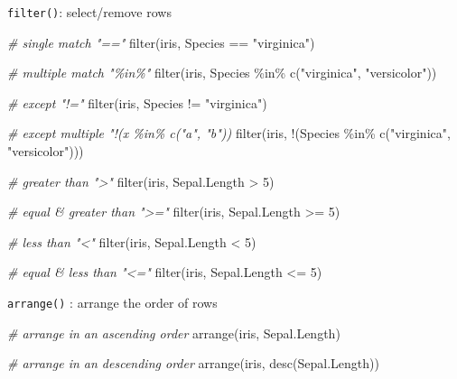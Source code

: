 \documentclass[
]{article}
\newenvironment{Shaded}{\begin{snugshade}}{\end{snugshade}}
\newcommand{\CommentTok}[1]{\textcolor[rgb]{0.56,0.35,0.01}{\textit{#1}}}
\newcommand{\DecValTok}[1]{\textcolor[rgb]{0.00,0.00,0.81}{#1}}
\newcommand{\FunctionTok}[1]{\textcolor[rgb]{0.00,0.00,0.00}{#1}}
\newcommand{\NormalTok}[1]{#1}
\newcommand{\SpecialCharTok}[1]{\textcolor[rgb]{0.00,0.00,0.00}{#1}}
\newcommand{\StringTok}[1]{\textcolor[rgb]{0.31,0.60,0.02}{#1}}
\begin{document}
\texttt{filter()}: select/remove rows

\begin{Shaded}
\begin{Highlighting}[]
\CommentTok{\# single match "=="}
\FunctionTok{filter}\NormalTok{(iris, Species }\SpecialCharTok{==} \StringTok{"virginica"}\NormalTok{)}

\CommentTok{\# multiple match "\%in\%"}
\FunctionTok{filter}\NormalTok{(iris, Species }\SpecialCharTok{\%in\%} \FunctionTok{c}\NormalTok{(}\StringTok{"virginica"}\NormalTok{, }\StringTok{"versicolor"}\NormalTok{))}

\CommentTok{\# except "!="}
\FunctionTok{filter}\NormalTok{(iris, Species }\SpecialCharTok{!=} \StringTok{"virginica"}\NormalTok{)}

\CommentTok{\# except multiple "!(x \%in\% c("a", "b"))}
\FunctionTok{filter}\NormalTok{(iris, }\SpecialCharTok{!}\NormalTok{(Species }\SpecialCharTok{\%in\%} \FunctionTok{c}\NormalTok{(}\StringTok{"virginica"}\NormalTok{, }\StringTok{"versicolor"}\NormalTok{)))}

\CommentTok{\# greater than "\textgreater{}"}
\FunctionTok{filter}\NormalTok{(iris, Sepal.Length }\SpecialCharTok{\textgreater{}} \DecValTok{5}\NormalTok{)}

\CommentTok{\# equal \& greater than "\textgreater{}="}
\FunctionTok{filter}\NormalTok{(iris, Sepal.Length }\SpecialCharTok{\textgreater{}=} \DecValTok{5}\NormalTok{)}

\CommentTok{\# less than "\textless{}"}
\FunctionTok{filter}\NormalTok{(iris, Sepal.Length }\SpecialCharTok{\textless{}} \DecValTok{5}\NormalTok{)}

\CommentTok{\# equal \& less than "\textless{}="}
\FunctionTok{filter}\NormalTok{(iris, Sepal.Length }\SpecialCharTok{\textless{}=} \DecValTok{5}\NormalTok{)}
\end{Highlighting}
\end{Shaded}

\texttt{arrange()} : arrange the order of rows

\begin{Shaded}
\begin{Highlighting}[]
\CommentTok{\# arrange in an ascending order}
\FunctionTok{arrange}\NormalTok{(iris, Sepal.Length)}

\CommentTok{\# arrange in an descending order}
\FunctionTok{arrange}\NormalTok{(iris, }\FunctionTok{desc}\NormalTok{(Sepal.Length))}
\end{Highlighting}
\end{Shaded}
\end{document}
